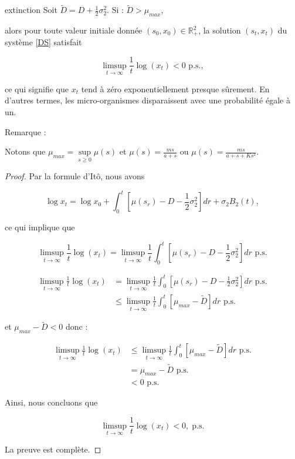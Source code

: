 \documentclass[12pt,a4paper]{report}%
\newcounter{remm}[chapter]
\newenvironment{remarque}[2][]
  {\refstepcounter{remm}
  \begin{bclogo}[
    couleur=white,
    arrondi=0.1,
    couleurBord=white,#1]{Remarque \theremm:#2}
  }
  {\end{bclogo}}
\begin{document}
\begin{théorème}{}{extinction}
	Soit \( \tilde{D} = D + \frac{1}{2} \sigma_2^2 \). Si : \( \tilde{D} > \mu_{max} \),
	
	alors pour toute valeur initiale donnée \( (s_0, x_0) \in \mathbb{R}_+^2 \), la solution \( (s_t, x_t) \) du système \eqref{DS} satisfait
	
	\[ \limsup_{t \to \infty} \frac{1}{t} \log(x_t) < 0 \text{ p.s.}, \]
	
	ce qui signifie que \( x_t \) tend à zéro exponentiellement presque sûrement. En d'autres termes, les micro-organismes disparaissent avec une probabilité égale à un.
\end{théorème}
\begin{remarque}{}
	Notons que $\mu_{max}=\sup\limits_{s\geqslant 0}\mu(s)$ et $\mu(s)=\frac{m s}{a+s}$ ou $\mu(s)=\frac{m s}{a+s+Ks^2}$.
	
\end{remarque}
\begin{proof}
	
	Par la formule d'Itô, nous avons
	
	\[ \log x_t = \log x_0 + \int_0^t \left[ \mu(s_r) - D - \frac{1}{2} \sigma_2^2 \right] dr + \sigma_2 B_2(t), \]
	
	ce qui implique que
	
	\[ \limsup_{t \to \infty} \frac{1}{t} \log(x_t) = \limsup_{t \to \infty} \frac{1}{t} \int_0^t \left[ \mu(s_r) - D - \frac{1}{2} \sigma_2^2  \right] dr \text{ p.s.} \]
	

	
	$$
	\begin{aligned}
		\limsup_{t \to \infty} \frac{1}{t} \log(x_t) &= \limsup_{t \to \infty} \frac{1}{t} \int_0^t \left[ \mu(s_r) - D - \frac{1}{2} \sigma_2^2  \right] dr \text{ p.s.} \\
		&\leqslant  \limsup_{t \to \infty} \frac{1}{t} \int_0^t \left[\mu_{max}-\tilde{D}   \right] dr \text{ p.s.}
	\end{aligned}
	$$
	
	et $\mu_{max}-\tilde{D}<0$ donc :
	
	$$
	\begin{aligned}
		\limsup_{t \to \infty} \frac{1}{t} \log(x_t) & \leqslant  \limsup_{t \to \infty} \frac{1}{t} \int_0^t \left[\mu_{max}-\tilde{D}   \right] dr \text{ p.s.}\\
		&= \mu_{max}-\tilde{D} \text{ p.s.}\\
		&< 0 \text{ p.s.}
	\end{aligned}
	$$
	
	Ainsi, nous concluons que
	
	\[ \limsup_{t \to \infty} \frac{1}{t} \log(x_t) < 0,\;\text{p.s.} \]
	
	La preuve est complète.
	
\end{proof}
\end{document}
